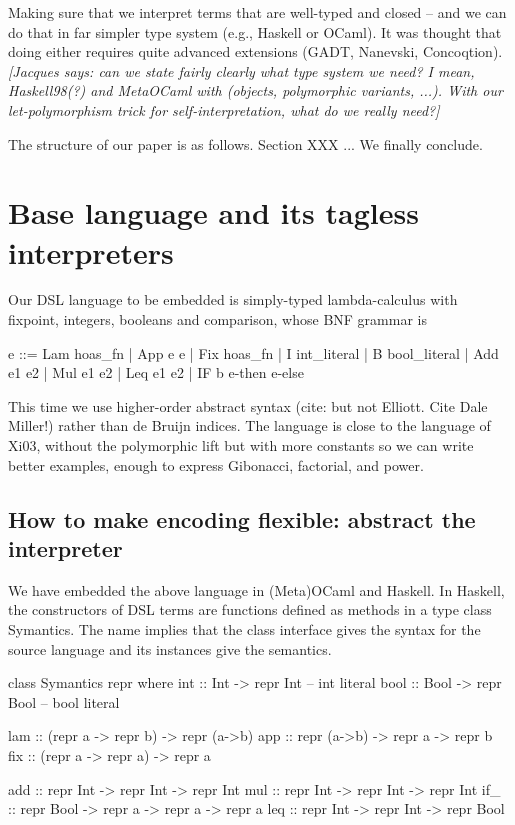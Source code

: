 \documentclass[preprint]{sigplanconf}
\newcommand{\jacques}[1]{{\it [Jacques says: #1]}}
\begin{document}
Making sure that we interpret terms that are well-typed and closed --
and we can do that in far simpler type system (e.g., Haskell or
OCaml). It was thought that doing either requires quite advanced
extensions (GADT, Nanevski, Concoqtion).
\jacques{can we state fairly clearly what type system we need?  I mean,
Haskell98(?) and MetaOCaml with (objects, polymorphic variants, ...).
With our let-polymorphism trick for self-interpretation, what do we really
need?}

The structure of our paper is as follows. Section XXX ...
We finally conclude.

\section{Base language and its tagless interpreters}\label{language}

Our DSL language to be embedded is simply-typed lambda-calculus
with fixpoint, integers, booleans and comparison, whose BNF grammar is

\begin{code}
  e ::= Lam hoas_fn | App e e | Fix hoas_fn |
  I int_literal | B bool_literal | Add e1 e2 | 
  Mul e1 e2 | Leq e1 e2 | IF b e-then e-else
\end{code}

This time we use higher-order abstract syntax (cite: but not
Elliott. Cite Dale Miller!) rather than de Bruijn indices.  The
language is close to the language of Xi03, without the polymorphic
lift but with more constants so we can write better examples, enough to
express Gibonacci, factorial, and power.

\subsection{How to make encoding flexible: abstract the interpreter}
\label{encoding}
We have embedded the above language in (Meta)OCaml and Haskell.  In Haskell,
the constructors of DSL terms are functions defined as methods in a type class
Symantics. The name implies that the class interface gives the syntax for
the source language and its instances give the semantics.

\begin{code}
class Symantics repr where
  int :: Int -> repr Int            -- int literal
  bool :: Bool -> repr Bool         -- bool literal

  lam :: (repr a -> repr b) -> repr (a->b)
  app :: repr (a->b) -> repr a -> repr b
  fix :: (repr a -> repr a) -> repr a

  add :: repr Int -> repr Int -> repr Int
  mul :: repr Int -> repr Int -> repr Int
  if_ :: repr Bool -> repr a -> repr a -> repr a
  leq :: repr Int -> repr Int -> repr Bool
\end{code}
\end{document}
